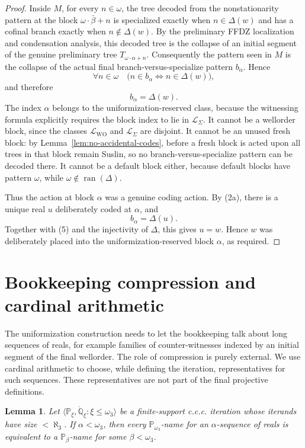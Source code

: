 \documentclass[11pt]{article}
\theoremstyle{plain}
\newtheorem{lemma}[theorem]{Lemma}
\theoremstyle{definition}
\theoremstyle{remark}
\begin{document}
\begin{proof}
Inside $M$, for every $n\in\omega$, the tree decoded from the nonstationarity
pattern at the block $\omega\cdot\bar\beta+n$ is specialized exactly when
$n\in\Delta(w)$ and has a cofinal branch exactly when $n\notin\Delta(w)$.  By the
preliminary FFDZ localization and condensation analysis, this decoded tree is the
collapse of an initial segment of the genuine preliminary tree
$T_{\omega\cdot\alpha+n}$.  Consequently the pattern seen in $M$ is the collapse
of the actual final branch-versus-specialize pattern $b_\alpha$.  Hence
\[
\forall n\in\omega\quad
\bigl(n\in b_\alpha\Longleftrightarrow n\in\Delta(w)\bigr),
\]
and therefore
\[
b_\alpha=\Delta(w).                            \tag{5}
\]
The index $\alpha$ belongs to the uniformization-reserved class, because the
witnessing formula explicitly requires the block index to lie in
$\mathcal L_\Sigma$.  It cannot be a wellorder block, since the classes
$\mathcal L_{\mathrm{WO}}$ and $\mathcal L_\Sigma$ are disjoint.  It cannot be an
unused fresh block: by Lemma~\ref{lem:no-accidental-codes}, before a fresh block
is acted upon all trees in that block remain Suslin, so no
branch-versus-specialize pattern can be decoded there.  It cannot be a default
block either, because default blocks have pattern $\omega$, while
$\omega\notin\operatorname{ran}(\Delta)$.

Thus the action at block $\alpha$ was a genuine coding action.  By (2a), there is a
unique real $u$ deliberately coded at $\alpha$, and
\[
b_\alpha=\Delta(u).
\]
Together with (5) and the injectivity of $\Delta$, this gives $u=w$.  Hence $w$ was
deliberately placed into the uniformization-reserved block $\alpha$, as required.
\end{proof}

\section{Bookkeeping compression and cardinal arithmetic}\label{sec:compression}

The uniformization construction needs to let the bookkeeping talk about long
sequences of reals, for example families of counter-witnesses indexed by an
initial segment of the final wellorder.  The role of compression is purely
external.  We use cardinal arithmetic to choose, while defining the iteration,
representatives for such sequences.  These representatives are not part of the
final projective definitions.

\begin{lemma}\label{lem:bounded-sequence-names}
Let $\langle\mathbb P_\xi,\dot{\mathbb Q}_\xi:\xi\leq\omega_3\rangle$ be a
finite-support c.c.c. iteration whose iterands have size $<\aleph_3$.  If
$\alpha<\omega_3$, then every $\mathbb P_{\omega_3}$-name for an
$\alpha$-sequence of reals is equivalent to a $\mathbb P_\beta$-name for some
$\beta<\omega_3$.
\end{lemma}
\end{document}
